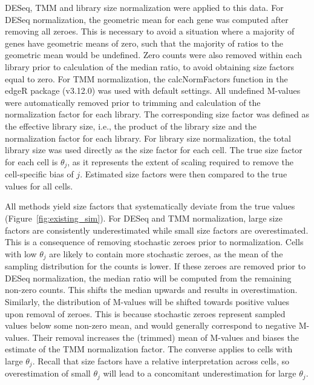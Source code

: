 \documentclass{article}
\begin{document}
DESeq, TMM and library size normalization were applied to this data.
For DESeq normalization, the geometric mean for each gene was computed after removing all zeroes.
This is necessary to avoid a situation where a majority of genes have geometric means of zero, such that the majority of ratios to the geometric mean would be undefined.
Zero counts were also removed within each library prior to calculation of the median ratio, to avoid obtaining size factors equal to zero.
For TMM normalization, the calcNormFactors function in the edgeR package (v3.12.0) was used with default settings.
All undefined M-values were automatically removed prior to trimming and calculation of the normalization factor for each library.
The corresponding size factor was defined as the effective library size, i.e., the product of the library size and the normalization factor for each library.
For library size normalization, the total library size was used directly as the size factor for each cell.
The true size factor for each cell is $\theta_j$, as it represents the extent of scaling required to remove the cell-specific bias of $j$.
Estimated size factors were then compared to the true values for all cells.

All methods yield size factors that systematically deviate from the true values (Figure~\ref{fig:existing_sim}).
For DESeq and TMM normalization, large size factors are consistently underestimated while small size factors are overestimated.
This is a consequence of removing stochastic zeroes prior to normalization.
Cells with low $\theta_j$ are likely to contain more stochastic zeroes, as the mean of the sampling distribution for the counts is lower.
If these zeroes are removed prior to DESeq normalization, the median ratio will be computed from the remaining non-zero counts.
This shifts the median upwards and results in overestimation.
Similarly, the distribution of M-values will be shifted towards positive values upon removal of zeroes.
This is because stochastic zeroes represent sampled values below some non-zero mean, and would generally correspond to negative M-values.
Their removal increases the (trimmed) mean of M-values and biases the estimate of the TMM normalization factor.
The converse applies to cells with large $\theta_j$.
Recall that size factors have a relative interpretation across cells, so overestimation of small $\theta_j$ will lead to a concomitant underestimation for large $\theta_j$.
\end{document}
